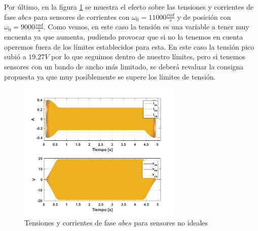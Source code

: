 \documentclass[10pt]{article}
\begin{document}
\begin{itemize}
Por último, en la figura \ref{fig:corrientesensores} se muestra el efecto sobre las tensiones y corrientes de fase $abcs$ para sensores de corrientes con $\omega_{0}=11000 \frac{rad}{s}$ y de posición con $\omega_{0}=9000 \frac{rad}{s}$. Como vemos, en este caso la tensión es una variable a tener muy encuenta ya que aumenta, pudiendo provocar que si no la tenemos en cuenta operemos fuera de los límites establecidos para esta. En este caso la tensión pico subió a $19.27 V$ por lo que seguimos dentro de nuestro límites, pero si tenemos sensores con un bando de ancho más limitado, se deberá revaluar la consigna propuesta ya que muy posiblemente se supere los límites de tensión.
 \begin{figure}[h!]
	\centering
	\includegraphics[width=0.7\textwidth]{corrientesensores.png}
	\caption{\label{fig:corrientesensores}Tensiones y corrientes de fase $abcs$ para sensores no ideales}
	\end{figure}
\end{itemize}

\newpage
\end{document}
